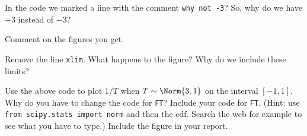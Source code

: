 \begin{verbatim}
\end{verbatim}

\begin{exercise}
In the code we marked a line with the comment \texttt{why not -3}? So, why do we have $+3$ instead of $-3$?
\end{exercise}

\begin{exercise}
Comment on the figures you get.
\end{exercise}

\begin{exercise}
Remove the line \texttt{xlim}. What happens to the figure? Why do we include these limits?
\end{exercise}



\begin{exercise}
Use the above code to plot $1/T$ when $T\sim \Norm{3, 1}$ on the interval $[-1, 1]$.
Why do you have to change the code for \texttt{FT}?
Include your code for \texttt{FT}. (Hint: use \texttt{from scipy.stats import norm} and then the cdf. Search the web for example to see what you have to type.)
Include the figure in your report.
\end{exercise}





